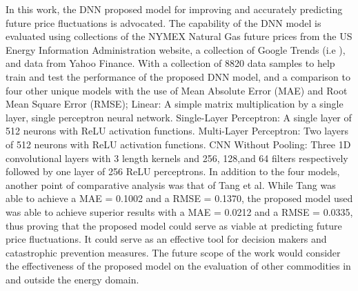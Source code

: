 \documentclass[final]{cvpr}
\begin{document}
In this work, the DNN proposed model for improving and accurately predicting future
price fluctuations is advocated. The capability of the DNN model is evaluated using
collections of the NYMEX Natural Gas future prices from the US Energy Information 
Administration website, a collection of Google Trends (i.e ), and data from Yahoo 
Finance. With a collection of 8820 data samples to help train and test the 
performance of the proposed DNN model, and a comparison to four other unique models 
with the use of Mean Absolute Error (MAE) and Root Mean Square Error (RMSE); 
Linear: A simple matrix multiplication by a single layer, single perceptron neural 
network. Single-Layer Perceptron: A single layer of 512 neurons with ReLU activation 
functions. Multi-Layer Perceptron: Two layers of 512 neurons with ReLU activation 
functions. CNN Without Pooling: Three 1D convolutional layers with 3 length kernels 
and 256, 128,and 64 filters respectively followed by one layer of 256 ReLU perceptrons.
In addition to the four models, another point of comparative analysis was that of 
Tang et al. While Tang was able to achieve a MAE = 0.1002 and a RMSE = 0.1370, 
the proposed model used was able to achieve superior results with a MAE = 0.0212 
and a RMSE = 0.0335, thus proving that the proposed model could serve as viable 
at predicting future price fluctuations. It could serve as an effective tool for 
decision makers and catastrophic prevention measures. The future scope of the work
would consider the effectiveness of the proposed model on the evaluation of other 
commodities in and outside the energy domain.


\nocite{*}

{\small
    
    
}
\end{document}
